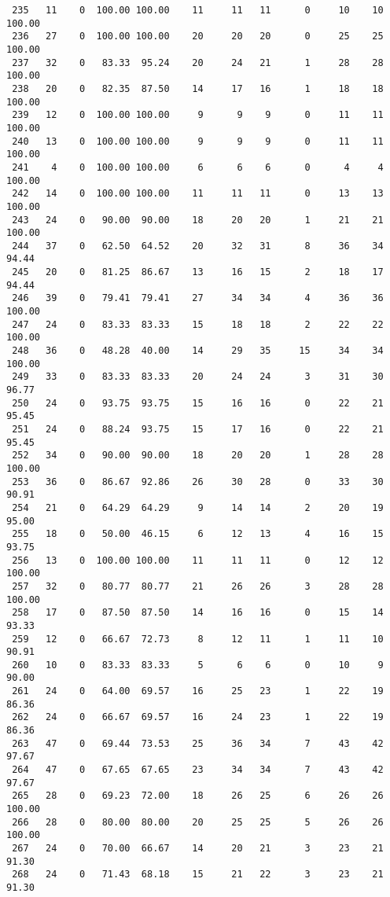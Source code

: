 \begin{verbatim}
 235   11    0  100.00 100.00    11     11   11      0     10    10   100.00
 236   27    0  100.00 100.00    20     20   20      0     25    25   100.00
 237   32    0   83.33  95.24    20     24   21      1     28    28   100.00
 238   20    0   82.35  87.50    14     17   16      1     18    18   100.00
 239   12    0  100.00 100.00     9      9    9      0     11    11   100.00
 240   13    0  100.00 100.00     9      9    9      0     11    11   100.00
 241    4    0  100.00 100.00     6      6    6      0      4     4   100.00
 242   14    0  100.00 100.00    11     11   11      0     13    13   100.00
 243   24    0   90.00  90.00    18     20   20      1     21    21   100.00
 244   37    0   62.50  64.52    20     32   31      8     36    34    94.44
 245   20    0   81.25  86.67    13     16   15      2     18    17    94.44
 246   39    0   79.41  79.41    27     34   34      4     36    36   100.00
 247   24    0   83.33  83.33    15     18   18      2     22    22   100.00
 248   36    0   48.28  40.00    14     29   35     15     34    34   100.00
 249   33    0   83.33  83.33    20     24   24      3     31    30    96.77
 250   24    0   93.75  93.75    15     16   16      0     22    21    95.45
 251   24    0   88.24  93.75    15     17   16      0     22    21    95.45
 252   34    0   90.00  90.00    18     20   20      1     28    28   100.00
 253   36    0   86.67  92.86    26     30   28      0     33    30    90.91
 254   21    0   64.29  64.29     9     14   14      2     20    19    95.00
 255   18    0   50.00  46.15     6     12   13      4     16    15    93.75
 256   13    0  100.00 100.00    11     11   11      0     12    12   100.00
 257   32    0   80.77  80.77    21     26   26      3     28    28   100.00
 258   17    0   87.50  87.50    14     16   16      0     15    14    93.33
 259   12    0   66.67  72.73     8     12   11      1     11    10    90.91
 260   10    0   83.33  83.33     5      6    6      0     10     9    90.00
 261   24    0   64.00  69.57    16     25   23      1     22    19    86.36
 262   24    0   66.67  69.57    16     24   23      1     22    19    86.36
 263   47    0   69.44  73.53    25     36   34      7     43    42    97.67
 264   47    0   67.65  67.65    23     34   34      7     43    42    97.67
 265   28    0   69.23  72.00    18     26   25      6     26    26   100.00
 266   28    0   80.00  80.00    20     25   25      5     26    26   100.00
 267   24    0   70.00  66.67    14     20   21      3     23    21    91.30
 268   24    0   71.43  68.18    15     21   22      3     23    21    91.30

\end{verbatim}
